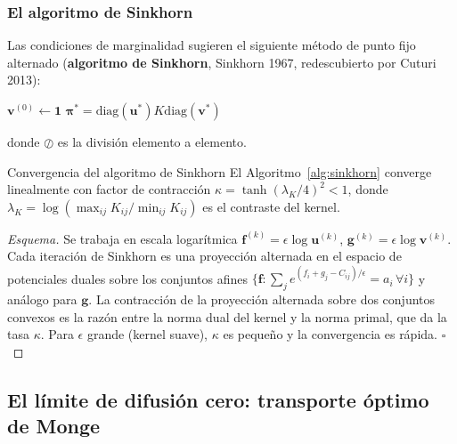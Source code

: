\subsubsection*{El algoritmo de Sinkhorn}

Las condiciones de marginalidad sugieren el siguiente método de punto fijo
alternado (\textbf{algoritmo de Sinkhorn}, Sinkhorn 1967, redescubierto por
Cuturi 2013):

\begin{algorithm}[H]
\caption{Algoritmo de Sinkhorn}
\label{alg:sinkhorn}
$\bm{v}^{(0)} \leftarrow \bm{1}$\;
\Return $\bm{\pi}^* = \mathrm{diag}(\bm{u}^*)K\mathrm{diag}(\bm{v}^*)$\;
\end{algorithm}

donde $\oslash$ es la división elemento a elemento.

\begin{proposicion}{Convergencia del algoritmo de Sinkhorn}
\label{prop:sinkhorn_convergencia}
El Algoritmo~\ref{alg:sinkhorn} converge linealmente con factor de contracción
$\kappa = \tanh(\lambda_K/4)^2 < 1$, donde $\lambda_K = \log(\max_{ij}K_{ij}/
\min_{ij}K_{ij})$ es el contraste del kernel.
\end{proposicion}

\begin{proof}[Esquema]
Se trabaja en escala logarítmica $\bm{f}^{(k)} = \epsilon\log\bm{u}^{(k)}$,
$\bm{g}^{(k)} = \epsilon\log\bm{v}^{(k)}$. Cada iteración de Sinkhorn es una
proyección alternada en el espacio de potenciales duales sobre los conjuntos
afines $\{\bm{f}: \sum_j e^{(f_i+g_j-C_{ij})/\epsilon} = a_i\,\forall i\}$ y
análogo para $\bm{g}$. La contracción de la proyección alternada sobre dos
conjuntos convexos es la razón entre la norma dual del kernel y la norma
primal, que da la tasa $\kappa$. Para $\epsilon$ grande (kernel suave),
$\kappa$ es pequeño y la convergencia es rápida. $\square$
\end{proof}

\subsection{El límite de difusión cero: transporte óptimo de Monge}
\label{subsec:ot_limite}

